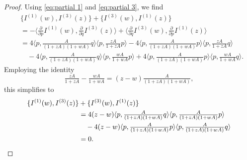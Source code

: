 \documentclass{amsart}
\theoremstyle{definition}
\numberwithin{equation}{section}
\newcommand{\la}{\langle}
\newcommand{\ra}{\rangle}
\begin{document}
\begin{proof}
Using \eqref{eq:partial 1} and \eqref{eq:partial 3}, we find
\begin{align*}
&\{I^{(1)}(w),I^{(3)}(z)\} + \{I^{(3)}(w),I^{(1)}(z)\}\\ 
&=-\bigl\langle \tfrac{\partial}{\partial p} I^{(1)}(w),\tfrac{\partial}{\partial q} I^{(3)}(z) \bigr\rangle
	+ \bigl\langle \tfrac{\partial}{\partial q} I^{(3)}(w),\tfrac{\partial}{\partial p} I^{(1)}(z) \bigr\rangle\\
&= 4\la p,\tfrac{A}{(1+zA)(1+wA)}q\ra\la p, \tfrac{zA}{1+z A}p\ra- 4\la p,\tfrac{A}{(1+zA)(1+wA)}p\ra\la p, \tfrac{zA}{1+zA}q\ra\\
&\quad-4\la p,\tfrac{A}{(1+zA)(1+wA)}q\ra\la p, \tfrac{wA}{1+wA}p\ra+4\la p,\tfrac{A}{(1+zA)(1+wA)}p\ra\la p, \tfrac{wA}{1+wA}q\ra.
\end{align*}
Employing the identity
\begin{equation}\label{id}
 \tfrac{zA}{1+z A}- \tfrac{wA}{1+w A} = (z-w) \tfrac{A}{(1+z A)(1+wA)},
\end{equation}
this simplifies to 
\begin{align}\label{eq:poisson_commutativity 2}
\{I^{(1)}(w),I^{(3)}(z)\} &+ \{I^{(3)}(w),I^{(1)}(z)\} \\ 
&=4(z-w)\la p,\tfrac{A}{(1+zA)(1+wA)}q\ra\la p, \tfrac{A}{(1+z A)(1+wA)} p\ra\notag\\
&\quad-4(z-w)\la p,\tfrac{A}{(1+zA)(1+wA)}p\ra\la p, \tfrac{A}{(1+z A)(1+wA)} q\ra\notag\\
&=0.\notag
\end{align}


\end{proof}
\end{document}
